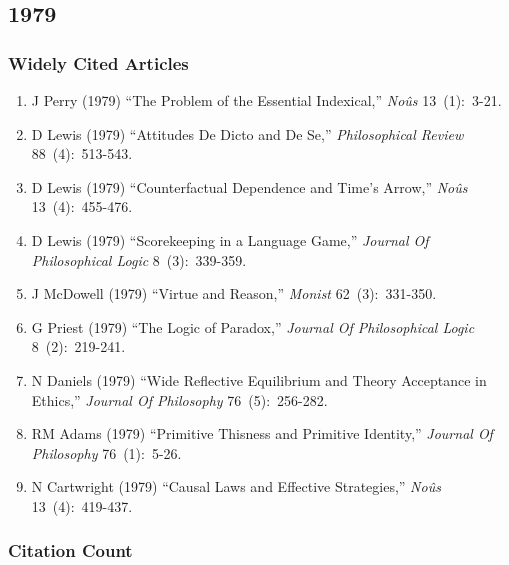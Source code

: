 \documentclass[
  10pt,
  letterpaper,
  DIV=11,
  numbers=noendperiod,
  twoside]{scrartcl}
\providecommand{\tightlist}{%
  \setlength{\itemsep}{0pt}\setlength{\parskip}{0pt}}\usepackage{longtable,booktabs,array}
\begin{document}
\newpage

\subsection{1979}\label{sec-s1979}

\subsubsection*{Widely Cited Articles}\label{widely-cited-articles-22}

\begin{enumerate}
\def\labelenumi{\arabic{enumi}.}
\tightlist
\item
  J Perry (1979) ``The Problem of the Essential Indexical,'' \emph{Noûs}
  13~(1):~3-21.
\item
  D Lewis (1979) ``Attitudes De Dicto and De Se,'' \emph{Philosophical
  Review} 88~(4):~513-543.
\item
  D Lewis (1979) ``Counterfactual Dependence and Time's Arrow,''
  \emph{Noûs} 13~(4):~455-476.
\item
  D Lewis (1979) ``Scorekeeping in a Language Game,'' \emph{Journal Of
  Philosophical Logic} 8~(3):~339-359.
\item
  J McDowell (1979) ``Virtue and Reason,'' \emph{Monist}
  62~(3):~331-350.
\item
  G Priest (1979) ``The Logic of Paradox,'' \emph{Journal Of
  Philosophical Logic} 8~(2):~219-241.
\item
  N Daniels (1979) ``Wide Reflective Equilibrium and Theory Acceptance
  in Ethics,'' \emph{Journal Of Philosophy} 76~(5):~256-282.
\item
  RM Adams (1979) ``Primitive Thisness and Primitive Identity,''
  \emph{Journal Of Philosophy} 76~(1):~5-26.
\item
  N Cartwright (1979) ``Causal Laws and Effective Strategies,''
  \emph{Noûs} 13~(4):~419-437.
\end{enumerate}

\subsubsection*{Citation Count}\label{sec-count-1979}
\end{document}
